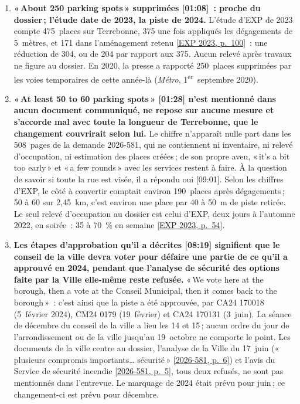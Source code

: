 \documentclass[10pt,letterpaper]{article}
\newcommand{\repourl}{https://github.com/OpenMobilityData/Terrebonne-open-sources}
\newcommand{\pagesurl}{https://openmobilitydata.github.io/Terrebonne-access-requests}
\newcommand{\cliptime}[1]{\textsf{\small[#1]}}
\newcommand{\pgl}[2]{\href{\pagesurl/2026-581/raw/01_emails_mandate_counts.pdf\#page=#1}{\textsf{\small[2026-581, p.~#2]}}}
\newcommand{\pg}[1]{\pgl{#1}{#1}}
\newcommand{\exppg}[1]{\href{\repourl/blob/main/2023-exp-mobility-study/raw/EXP_Etude_de_mobilite_rue_de_Terrebonne_2023.pdf}{\textsf{\small[EXP 2023, p.~#1]}}}
\begin{document}
\begin{enumerate}[nosep,itemsep=0.3em,leftmargin=1.4em]
  \item \begin{minipage}[t]{\linewidth}\textbf{«\,About 250 parking spots\,» supprimées \cliptime{01:08}~: proche du dossier\,; l'étude date de 2023, la piste de 2024.} L'étude d'EXP de 2023 compte 475~places sur Terrebonne, 375 une fois appliqués les dégagements de 5~mètres, et 171 dans l'aménagement retenu \exppg{100}~: une réduction de 304, ou de 204 par rapport aux 375. Aucun relevé après travaux ne figure au dossier. En 2020, la presse a rapporté 250~places supprimées par les voies temporaires de cette année-là (\emph{Métro}, 1\textsuperscript{er}~septembre 2020).\end{minipage}\vspace{0.35em}
  \item \begin{minipage}[t]{\linewidth}\textbf{«\,At least 50 to 60 parking spots\,» \cliptime{01:28} n'est mentionné dans aucun document communiqué, ne repose sur aucune mesure et s'accorde mal avec toute la longueur de Terrebonne, que le changement couvrirait selon lui.} Le chiffre n'apparaît nulle part dans les 508~pages de la demande 2026-581, qui ne contiennent ni inventaire, ni relevé d'occupation, ni estimation des places créées\,; de son propre aveu, «\,it's a bit too early\,» et «\,a few rounds\,» avec les services restent à faire. À la question de savoir si toute la rue est visée, il a répondu oui \cliptime{09:01}. Selon les chiffres d'EXP, le côté à convertir comptait environ 190~places après dégagements\,; 50 à 60 sur 2{,}45~km, c'est environ une place par 40 à 50~m de piste retirée. Le seul relevé d'occupation au dossier est celui d'EXP, deux jours à l'automne 2022, en soirée~: 35 à 70~\% en semaine \exppg{54}.\end{minipage}\vspace{0.35em}
  \item \begin{minipage}[t]{\linewidth}\textbf{Les étapes d'approbation qu'il a décrites \cliptime{08:19} signifient que le conseil de la ville devra voter pour défaire une partie de ce qu'il a approuvé en 2024, pendant que l'analyse de sécurité des options faite par la Ville elle-même reste refusée.} «\,We vote here at the borough, then a vote at the Conseil Municipal, then it comes back to the borough\,»~: c'est ainsi que la piste a été approuvée, par CA24 170018 (5~février 2024), CM24 0179 (19~février) et CA24 170131 (3~juin). La séance de décembre du conseil de la ville a lieu les 14 et 15\,; aucun ordre du jour de l'arrondissement ou de la ville jusqu'au 19~octobre ne comporte le point. Les documents de la ville centre au dossier, l'analyse de la Ville du 17~juin («\,plusieurs compromis importants… sécurité\,» \pg{6}) et l'avis du Service de sécurité incendie \pg{5}, tous deux refusés, ne sont pas mentionnés dans l'entrevue. Le marquage de 2024 était prévu pour juin\,; ce changement-ci est prévu pour décembre.\end{minipage}\vspace{0.35em}

\end{enumerate}
\end{document}
